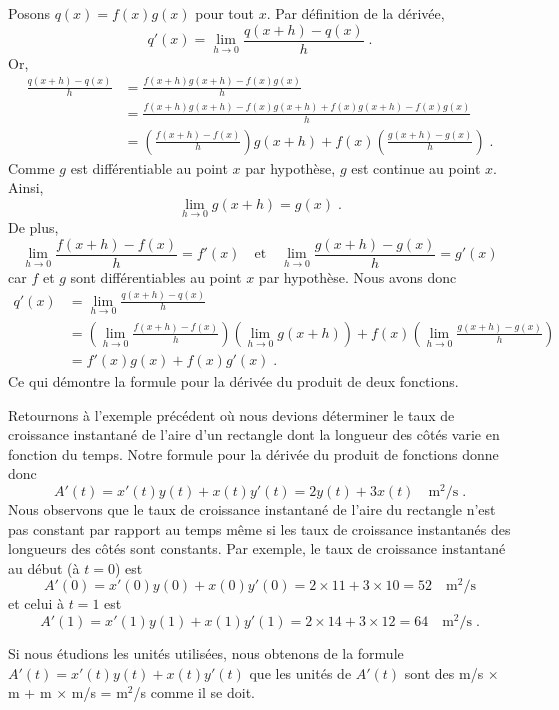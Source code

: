 {Posons $q(x) = f(x) g(x)$ pour tout $x$.  Par définition de la
dérivée,
\[
q'(x) = \lim_{h\rightarrow 0} \frac{q(x+h)-q(x)}{h} \; .
\]
Or,
\begin{align*}
\frac{q(x+h)-q(x)}{h} &= \frac{f(x+h)g(x+h) - f(x)g(x)}{h} \\
&= \frac{f(x+h)g(x+h) - f(x)g(x+h) + f(x)g(x+h) - f(x)g(x)}{h} \\
&= \left(\frac{f(x+h) - f(x)}{h}\right) g(x+h)
+f(x) \left( \frac{g(x+h) - g(x)}{h} \right) \; .
\end{align*}
Comme $g$ est différentiable au point $x$ par hypothèse, $g$ est
continue au point $x$.  Ainsi,
\[
\lim_{h\rightarrow 0} g(x+h) = g(x) \;.
\]
De plus,
\[
\lim_{h\rightarrow 0} \frac{f(x+h) - f(x)}{h} = f'(x)
\quad \text{et} \quad
\lim_{h\rightarrow 0} \frac{g(x+h) - g(x)}{h} = g'(x)
\]
car $f$ et $g$ sont différentiables au point $x$ par hypothèse.  Nous avons
donc
\begin{align*}
q'(x) &= \lim_{h\rightarrow 0} \frac{q(x+h)-q(x)}{h} \\
&= \left( \lim_{h\rightarrow 0} \frac{f(x+h) - f(x)}{h} \right)
\left( \lim_{h\rightarrow 0} g(x+h) \right)
+ f(x) \left( \lim_{h\rightarrow 0} \frac{g(x+h) - g(x)}{h} \right) \\
&=f'(x) g(x) + f(x) g'(x) \; .
\end{align*}
Ce qui démontre la formule pour la dérivée du produit de deux
fonctions.

\begin{egg}
Retournons à l'exemple précédent où nous devions déterminer le taux de
croissance instantané de l'aire d'un rectangle dont la longueur des
côtés varie en fonction du temps.  Notre formule pour la dérivée du
produit de fonctions donne donc
\[
A'(t) = x'(t) y(t) + x(t) y'(t) = 2 y(t) + 3 x(t) \quad \text{m$^2$/s}
\; .
\]
Nous observons que le taux de croissance instantané de l'aire du rectangle
n'est pas constant par rapport au temps même si les taux de croissance
instantanés des longueurs des côtés sont constants.  Par exemple, le
taux de croissance instantané au début (à $t=0$) est
\[
A'(0) = x'(0) y(0) + x(0) y'(0) = 2 \times 11 + 3 \times 10
= 52 \quad \text{m$^2$/s}
\]
et celui à $t=1$ est
\[
A'(1) = x'(1) y(1) + x(1) y'(1) = 2 \times 14 + 3 \times 12
= 64 \quad \text{m$^2$/s} \; .
\]

Si nous étudions les unités utilisées, nous obtenons de la formule
$A'(t) = x'(t) y(t) + x(t) y'(t)$ que les unités de $A'(t)$ sont des
m/s $\times$ m + m $\times$ m/s = m$^2$/s comme il se doit.
\end{egg}

}
